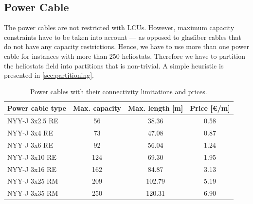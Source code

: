\subsection{Power Cable}
The power cables are not restricted with LCUs. However, maximum capacity constraints have to be taken into account --- as opposed to glasfiber cables that do not have any capacity restrictions. Hence, we have to use more than one power cable for instances with more than 250 heliostats. Therefore we have to partition the heliostats field into partitions that is non-trivial. A simple heuristic is presented in \cref{sec:partitioning}.
\begin{table}[H]
  \caption{Power cables with their connectivity limitations and prices.}
  \begin{center}
  \begin{tabular}{l|cc|c}
    Power cable type & Max. capacity & Max. length [m] & Price [\euro/m] \\
    \toprule
    NYY-J 3x2.5 RE & 56 & 38.36 & 0.58 \\
    NYY-J 3x4 RE & 73 & 47.08 & 0.87 \\
    NYY-J 3x6 RE & 92 & 56.04 & 1.24 \\
    NYY-J 3x10 RE & 124 & 69.30 & 1.95 \\
    NYY-J 3x16 RE & 162 & 84.87 & 3.13 \\
    \midrule
    NYY-J 3x25 RM & 209 & 102.79 & 5.19 \\
    NYY-J 3x35 RM & 250 & 120.31 & 6.90
  \end{tabular}
  \end{center}
\end{table}